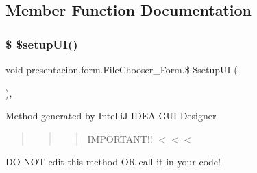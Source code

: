 \subsection{Member Function Documentation}
\mbox{\label{classpresentacion_1_1form_1_1FileChooser__Form_ab96ac21c9d7b860368a206f36f6ec4fb}} 
\subsubsection{\texorpdfstring{\$ \$setup\+U\+I()}{$ $setupUI()}}
{\footnotesize\ttfamily void presentacion.\+form.\+File\+Chooser\+\_\+\+Form.\$ \$setup\+UI (\begin{DoxyParamCaption}{ }\end{DoxyParamCaption})\hspace{0.3cm}{\ttfamily [inline]}, {\ttfamily [private]}}

Method generated by IntelliJ I\+D\+EA G\+UI Designer \begin{quote}
\begin{quote}
\begin{quote}
I\+M\+P\+O\+R\+T\+A\+N\+T!! $<$$<$$<$ \end{quote}
\end{quote}
\end{quote}
DO N\+OT edit this method OR call it in your code!


